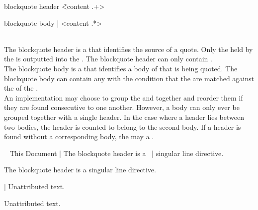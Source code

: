 \begin{identifier}{blockquote header}
\~ <content .+>
\end{identifier}
\begin{identifier}{blockquote body}
| <content .*>
\end{identifier}
 \\

The blockquote header is a  that identifies the source of a quote. Only the  held by the  is outputted into the . The blockquote header can only contain . \\

The blockquote body is a  that identifies a body of  that is being quoted. The blockquote body can contain any  with the condition that the  are matched against the  of the . \\

An implementation may choose to group the  and  together and reorder them if they are found consecutive to one another. However, a body can only ever be grouped together with a single header. In the case where a header lies between two bodies, the header is counted to belong to the second body. If a header is found without a corresponding body, the  may  a . \\

\begin{examples}
  \begin{examplesource}
~ This Document
| The blockquote header is a \
| singular line directive.
  \end{examplesource}
  \begin{exampleoutput}
    \begin{blockquote}
      The blockquote header is a singular line directive.
    \end{blockquote}
  \end{exampleoutput}
  \begin{examplesource}
| Unattributed text.
  \end{examplesource}
  \begin{exampleoutput}
    \begin{blockquote}
      Unattributed text.
    \end{blockquote}
  \end{exampleoutput}
\end{examples}


